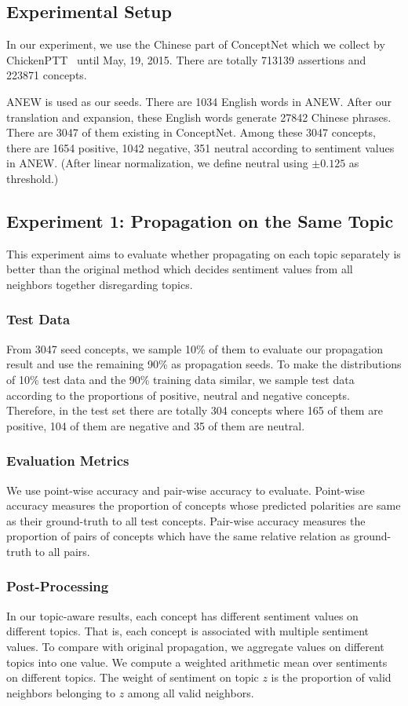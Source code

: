 \subsection{Experimental Setup}
In our experiment, we use the Chinese part of ConceptNet which we collect by ChickenPTT~\cite{Kuo:HCOMP09} until May, 19, 2015. There are totally 713139 assertions and 223871 concepts. 

ANEW is used as our seeds. There are 1034 English words in ANEW. After our translation and expansion, these English words generate 27842 Chinese phrases. There are 3047 of them existing in ConceptNet. Among these 3047 concepts, there are 1654 positive, 1042 negative, 351 neutral according to sentiment values in ANEW. (After linear normalization, we define neutral using $\pm0.125$ as threshold.)

\subsection{Experiment 1: Propagation on the Same Topic}
This experiment aims to evaluate whether propagating on each topic separately is better than the original method which decides sentiment values from all neighbors together disregarding topics.

\subsubsection{Test Data}
From 3047 seed concepts, we sample 10\% of them to evaluate our propagation result and use the remaining 90\% as propagation seeds. To make the distributions of 10\% test data and the 90\% training data similar, we sample test data according to the proportions of positive, neutral and negative concepts. Therefore, in the test set there are totally 304 concepts where 165 of them are positive, 104 of them are negative and 35 of them are neutral.

\subsubsection{Evaluation Metrics}
We use point-wise accuracy and pair-wise accuracy to evaluate. Point-wise accuracy measures the proportion of concepts whose predicted polarities are same as their ground-truth to all test concepts. Pair-wise accuracy measures the proportion of pairs of concepts which have the same relative relation as ground-truth to all pairs.

\subsubsection{Post-Processing}
In our topic-aware results, each concept has different sentiment values on different topics. That is, each concept is associated with multiple sentiment values. To compare with original propagation, we aggregate values on different topics into one value. We compute a weighted arithmetic mean over sentiments on different topics. The weight of sentiment on topic $z$ is the proportion of valid neighbors belonging to $z$ among all valid neighbors.

